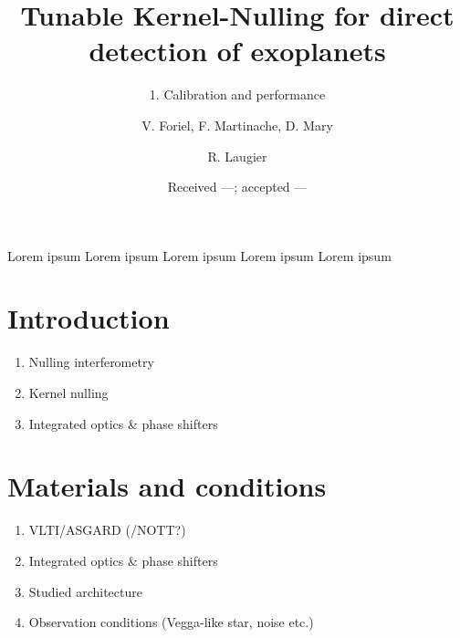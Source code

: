 \documentclass{aa}
\begin{document}
 


   \title{Tunable Kernel-Nulling for direct detection of exoplanets}

   \subtitle{1. Calibration and performance}

   \author{V. Foriel,
            F. Martinache,
            D. Mary
            \and
            R. Laugier
          }


   \date{Received ---; accepted ---}

 
  \abstract
   {Lorem ipsum}
   {Lorem ipsum}
   {Lorem ipsum}
   {Lorem ipsum}
   {Lorem ipsum}


   \maketitle
%

\section{Introduction}

    \begin{enumerate}
        \item Nulling interferometry
        \item Kernel nulling
        \item Integrated optics \& phase shifters
    \end{enumerate}


\section{Materials and conditions}

    \begin{enumerate}
        \item VLTI/ASGARD (/NOTT?)
        \item Integrated optics \& phase shifters
        \item Studied architecture
        \item Observation conditions (Vegga-like star, noise etc.)
    \end{enumerate}
\end{document}
